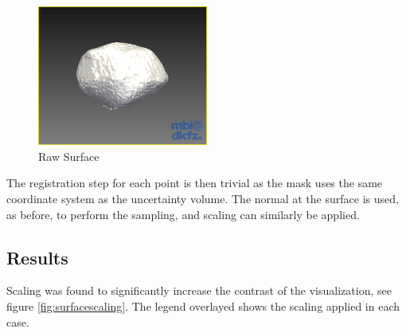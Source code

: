 \begin{figure}[H]
  \centering
  \includegraphics[width=0.5\textwidth]{images/surface/surface_raw.png}
  \caption{Raw Surface}\label{fig:surfaceraw}
\end{figure}

The registration step for each point is then trivial as the mask uses the same coordinate system as the uncertainty volume. The normal at the surface is used, as before, to perform the sampling, and scaling can similarly be applied.

\newpage
\subsection*{Results}
Scaling was found to significantly increase the contrast of the visualization, see figure \ref{fig:surfacescaling}. The legend overlayed shows the scaling applied in each case.

